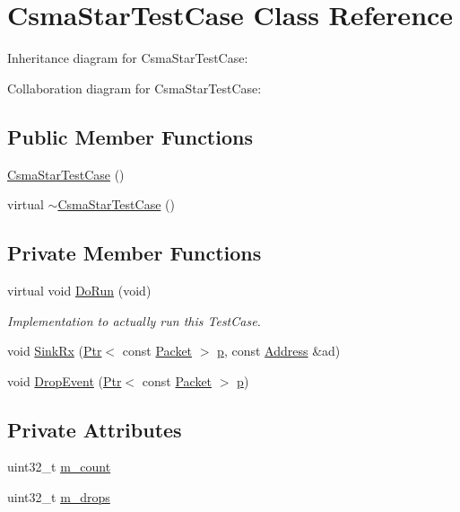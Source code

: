 \hypertarget{classCsmaStarTestCase}{}\section{Csma\+Star\+Test\+Case Class Reference}
\label{classCsmaStarTestCase}


Inheritance diagram for Csma\+Star\+Test\+Case\+:


Collaboration diagram for Csma\+Star\+Test\+Case\+:
\subsection*{Public Member Functions}
\begin{DoxyCompactItemize}
\item 
\hyperlink{classCsmaStarTestCase_a03a0bdd707fe6354df3ec50b3fae48ea}{Csma\+Star\+Test\+Case} ()
\item 
virtual \hyperlink{classCsmaStarTestCase_a8efcd1b0624a170a2f2425607750fc34}{$\sim$\+Csma\+Star\+Test\+Case} ()
\end{DoxyCompactItemize}
\subsection*{Private Member Functions}
\begin{DoxyCompactItemize}
\item 
virtual void \hyperlink{classCsmaStarTestCase_ab2214447716ce03f34f02b9e9af477d5}{Do\+Run} (void)
\begin{DoxyCompactList}\small\item\em Implementation to actually run this Test\+Case. \end{DoxyCompactList}\item 
void \hyperlink{classCsmaStarTestCase_aec6f484651b37b82bb951a5daef88434}{Sink\+Rx} (\hyperlink{classns3_1_1Ptr}{Ptr}$<$ const \hyperlink{classns3_1_1Packet}{Packet} $>$ \hyperlink{lte__link__budget__x2__handover__measures_8m_ac9de518908a968428863f829398a4e62}{p}, const \hyperlink{classns3_1_1Address}{Address} \&ad)
\item 
void \hyperlink{classCsmaStarTestCase_a0c12928e6a2d294360096a5d1e92a124}{Drop\+Event} (\hyperlink{classns3_1_1Ptr}{Ptr}$<$ const \hyperlink{classns3_1_1Packet}{Packet} $>$ \hyperlink{lte__link__budget__x2__handover__measures_8m_ac9de518908a968428863f829398a4e62}{p})
\end{DoxyCompactItemize}
\subsection*{Private Attributes}
\begin{DoxyCompactItemize}
\item 
uint32\+\_\+t \hyperlink{classCsmaStarTestCase_a3b380689a4e0e523c13abbdffde06781}{m\+\_\+count}
\item 
uint32\+\_\+t \hyperlink{classCsmaStarTestCase_ac16da6db1bd8b8670a54805706850e48}{m\+\_\+drops}
\end{DoxyCompactItemize}

